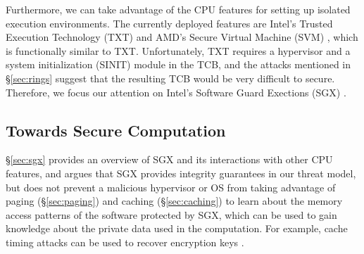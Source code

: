 Furthermore, we can take advantage of the CPU features for setting up isolated
execution environments. The currently deployed features are Intel's Trusted
Execution Technology (TXT) \cite{grawrock2009txt} and AMD's Secure Virtual
Machine (SVM) \cite{strongin2005trusted}, which is functionally similar to TXT.
Unfortunately, TXT requires a hypervisor and a system initialization (SINIT)
module in the TCB, and the attacks mentioned in \S \ref{sec:rings} suggest that
the resulting TCB would be very difficult to secure. Therefore, we focus our
attention on Intel's Software Guard Exections (SGX) \cite{mckeen2013innovative}
\cite{anati2013sgx}.

\subsection{Towards Secure Computation}
\label{sec:approach}

\S \ref{sec:sgx} provides an overview of SGX and its interactions with other
CPU features, and argues that SGX provides integrity guarantees in our threat
model, but does not prevent a malicious hypervisor or OS from taking advantage
of paging (\S \ref{sec:paging}) and caching (\S \ref{sec:caching}) to learn
about the memory access patterns of the software protected by SGX, which can be
used to gain knowledge about the private data used in the computation. For
example, cache timing attacks can be used to recover encryption keys
\cite{bonneau2006cache} \cite{brumley2005remote} \cite{kocher1996timing}.


